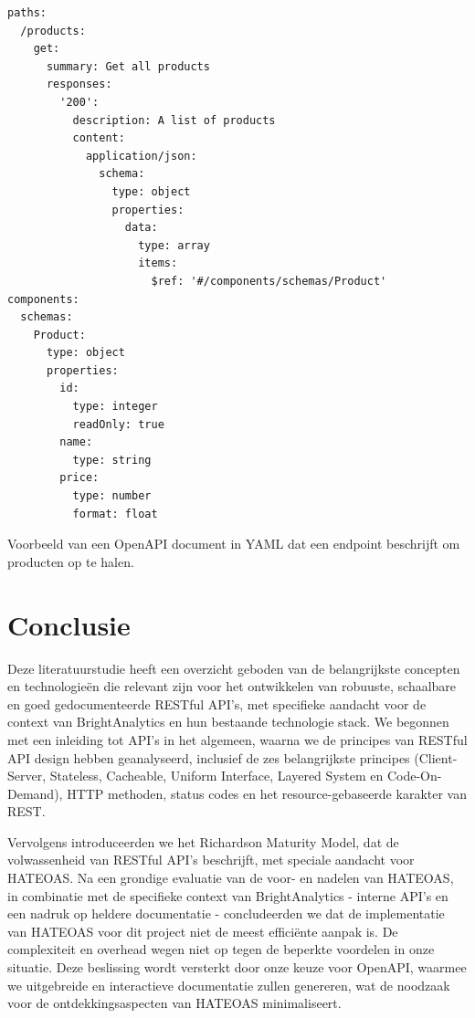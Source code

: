 \begin{listing}[H]
\begin{verbatim}
paths:
  /products:
    get:
      summary: Get all products
      responses:
        '200':
          description: A list of products
          content:
            application/json:
              schema:
                type: object
                properties:
                  data:
                    type: array
                    items:
                      $ref: '#/components/schemas/Product'
components:
  schemas:
    Product:
      type: object
      properties:
        id:
          type: integer
          readOnly: true
        name:
          type: string
        price:
          type: number
          format: float
\end{verbatim}
\caption[Voorbeeld van een OpenAPI document in YAML]{Voorbeeld van een OpenAPI document in YAML dat een endpoint beschrijft om producten op te halen.}
\label{lst:openapi_example_resource}
\end{listing}

\section{Conclusie}

Deze literatuurstudie heeft een overzicht geboden van de belangrijkste concepten en technologieën die relevant zijn voor het ontwikkelen van robuuste, schaalbare en goed gedocumenteerde RESTful API's, met specifieke aandacht voor de context van BrightAnalytics en hun bestaande technologie stack. We begonnen met een inleiding tot API's in het algemeen, waarna we de principes van RESTful API design hebben geanalyseerd, inclusief de zes belangrijkste principes (Client-Server, Stateless, Cacheable, Uniform Interface, Layered System en Code-On-Demand), HTTP methoden, status codes en het resource-gebaseerde karakter van REST.

\bigskip

Vervolgens introduceerden we het Richardson Maturity Model, dat de volwassenheid van RESTful API's beschrijft, met speciale aandacht voor HATEOAS. Na een grondige evaluatie van de voor- en nadelen van HATEOAS, in combinatie met de specifieke context van BrightAnalytics - interne API's en een nadruk op heldere documentatie - concludeerden we dat de implementatie van HATEOAS voor dit project niet de meest efficiënte aanpak is. De complexiteit en overhead wegen niet op tegen de beperkte voordelen in onze situatie. Deze beslissing wordt versterkt door onze keuze voor OpenAPI, waarmee we uitgebreide en interactieve documentatie zullen genereren, wat de noodzaak voor de ontdekkingsaspecten van HATEOAS minimaliseert.

